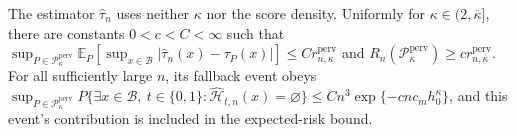 The estimator \(\widehat\tau_n\) uses neither \(\kappa\) nor the score density. Uniformly for \(\kappa\in(2,\overline\kappa]\), there are constants \(0<c<C<\infty\) such that \(\sup_{P\in\mathcal P_{\kappa}^{\mathrm{perv}}}\mathbb E_P[\sup_{x\in\mathcal B}|\widehat\tau_n(x)-\tau_P(x)|]\le C r_{n,\kappa}^{\mathrm{perv}}\) and \(R_n(\mathcal P_{\kappa}^{\mathrm{perv}})\ge c r_{n,\kappa}^{\mathrm{perv}}\). For all sufficiently large \(n\), its fallback event obeys \(\sup_{P\in\mathcal P_{\kappa}^{\mathrm{perv}}}P\{\exists x\in\mathcal B,\ t\in\{0,1\}:\widehat{\mathcal H}_{t,n}(x)=\varnothing\}\le Cn^3\exp\{-c n c_m h_0^{\kappa}\}\), and this event's contribution is included in the expected-risk bound.